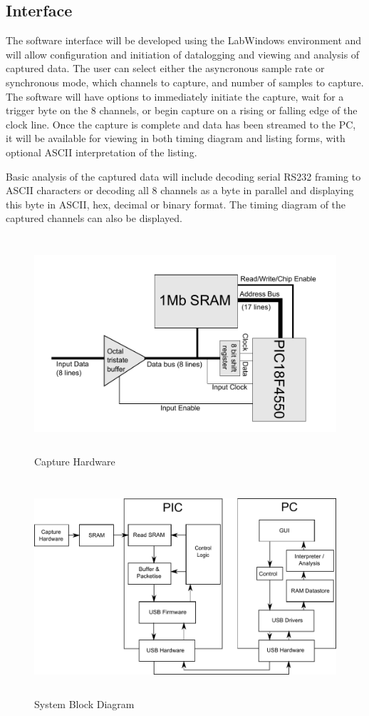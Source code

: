 \documentclass[11pt]{article}
\begin{document}
\subsection{Interface}
    The software interface will be developed using the LabWindows environment and will allow configuration and initiation of datalogging and viewing and analysis of captured data.  The user can select either the asyncronous sample rate or synchronous mode, which channels to capture, and number of samples to capture.  The software will have options to immediately initiate the capture, wait for a trigger byte on the 8 channels, or begin capture on a rising or falling edge of the clock line.  Once the capture is complete and data has been streamed to the PC, it will be available for viewing in both timing diagram and listing forms, with optional ASCII interpretation of the listing.



    Basic analysis of the captured data will include decoding serial RS232 framing
    to ASCII characters or decoding all 8 channels as a byte in parallel and
    displaying this byte in ASCII, hex, decimal or binary format.  The timing
    diagram of the captured channels can also be displayed.
    
    \begin{figure}
    \centering
    \includegraphics[height=8cm]{hardware.pdf}
    \caption{Capture Hardware}
    \label{fig:hw}
    \end{figure}

    \begin{figure}
    \centering
    \includegraphics[height=8cm]{block-diagram.pdf}
    \caption{System Block Diagram}
    \label{fig:app}
    \end{figure}
\end{document}
